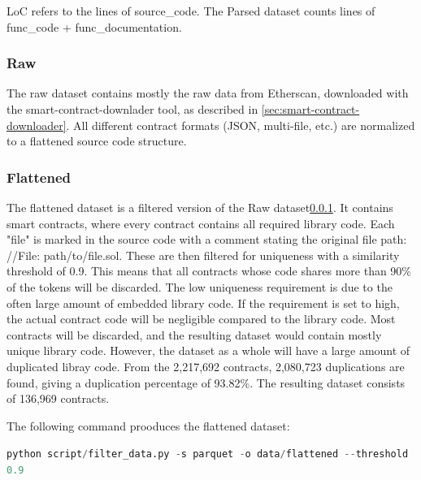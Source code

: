 LoC refers to the lines of source\_code. The Parsed dataset counts lines of func\_code + func\_documentation.

\subsubsection{Raw}
\label{sec:verified-smart-contracts-raw}
The raw dataset contains mostly the raw data from Etherscan, downloaded with the smart-contract-downlader tool, as described in \cref{sec:smart-contract-downloader}. All different contract formats (JSON, multi-file, etc.) are normalized to a flattened source code structure. 


\subsubsection{Flattened}
\label{sec:verified-smart-contracts-flattened}

The flattened dataset is a filtered version  of the Raw dataset\cref{sec:verified-smart-contracts-raw}. It contains smart contracts, where every contract contains all required library code. Each "file" is marked in the source code with a comment stating the original file path: //File: path/to/file.sol. These are then filtered for uniqueness with a similarity threshold of 0.9. This means that all contracts whose code shares more than 90\% of the tokens will be discarded. The low uniqueness requirement is due to the often large amount of embedded library code. If the requirement is set to high, the actual contract code will be negligible compared to the library code. Most contracts will be discarded, and the resulting dataset would contain mostly unique library code. However, the dataset as a whole will have a large amount of duplicated libray code. From the 2,217,692 contracts, 2,080,723 duplications are found, giving a duplication percentage of 93.82\%. The resulting dataset consists of 136,969 contracts.


The following command prooduces the flattened dataset:

\lstinline[language=Python]!python script/filter_data.py -s parquet -o data/flattened --threshold 0.9!


